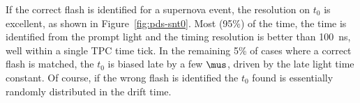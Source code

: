 If the correct flash is identified for a supernova event, the resolution on $t_0$ is excellent, as shown in Figure~\ref{fig:pds-snt0}. Most (95\%) of the time, the time is identified from the prompt light and the timing resolution is better than \SI{100}{ns}, well within a single TPC time tick. In the remaining 5\% of cases where a correct flash is matched, the $t_0$ is biased late by a few $\mus$, driven by the late light time constant. Of course, if the wrong flash is identified the $t_0$ found is essentially randomly distributed in the drift time.



